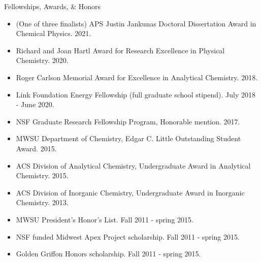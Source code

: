 \documentclass{resume} %
\begin{document}
\begin{rSection}{Fellowships, Awards, \& Honors}

\begin{itemize}[leftmargin = 0 pt]
	\item (One of three finalists) APS Justin Jankunas Doctoral Dissertation Award in Chemical Physics. 2021.
	\item Richard and Joan Hartl Award for Research Excellence in Physical Chemistry. 2020.
	\item Roger Carlson Memorial Award for Excellence in Analytical Chemistry. 2018.
	\item Link Foundation Energy Fellowship (full graduate school stipend). July 2018 - June 2020. 
	\item NSF Graduate Research Fellowship Program, Honorable mention. 2017.
	\item MWSU Department of Chemistry, Edgar C. Little Outstanding Student Award. 2015.
	\item ACS Division of Analytical Chemistry, Undergraduate Award in Analytical Chemistry. 2015. 
	\item ACS Division of Inorganic Chemistry, Undergraduate Award in Inorganic Chemistry. 2013.
	\item MWSU President’s Honor’s List. Fall 2011 - spring 2015.
	\item NSF funded Midwest Apex Project scholarship. Fall 2011 - spring 2015.
	\item Golden Griffon Honors scholarship. Fall 2011 - spring 2015.
\end{itemize}
\end{rSection}


\end{document}
